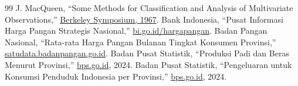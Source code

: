 \documentclass[journal, a4paper]{IEEEtran}
\begin{document}
\begin{thebibliography}{99}
   J. MacQueen, ``Some Methods for Classification and Analysis of Multivariate Observations,'' \href{https://projecteuclid.org/euclid.bsmsp/1200512992}{Berkeley Symposium, 1967}.
   Bank Indonesia, ``Pusat Informasi Harga Pangan Strategis Nasional,'' \href{https://www.bi.go.id/hargapangan}{bi.go.id/hargapangan}.
   Badan Pangan Nasional, ``Rata-rata Harga Pangan Bulanan Tingkat Konsumen Provinsi,'' \href{https://satudata.badanpangan.go.id}{satudata.badanpangan.go.id}.
   Badan Pusat Statistik, ``Produksi Padi dan Beras Menurut Provinsi,'' \href{https://www.bps.go.id}{bps.go.id}, 2024.
   Badan Pusat Statistik, ``Pengeluaran untuk Konsumsi Penduduk Indonesia per Provinsi,'' \href{https://www.bps.go.id}{bps.go.id}, 2024.
\end{thebibliography}
\end{document}
